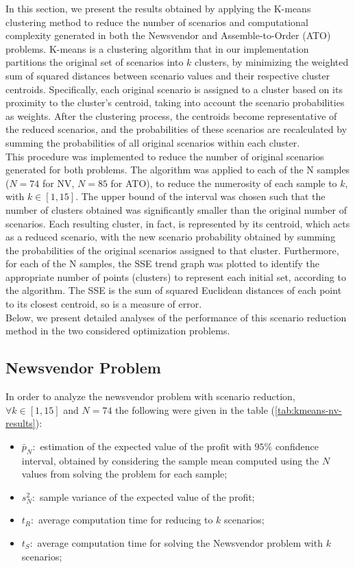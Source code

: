 \documentclass[a4paper,12pt]{article}
\begin{document}
	In this section, we present the results obtained by applying the K-means clustering method to reduce the number of scenarios and computational complexity generated in both the Newsvendor and Assemble-to-Order (ATO) problems. K-means is a clustering algorithm that in our implementation partitions the original set of scenarios into \(k\) clusters, by minimizing the weighted sum of squared distances between scenario values and their respective cluster centroids. Specifically, each original scenario is assigned to a cluster based on its proximity to the cluster's centroid, taking into account the scenario probabilities as weights. 
	After the clustering process, the centroids become representative of the reduced scenarios, and the probabilities of these scenarios are recalculated by summing the probabilities of all original scenarios within each cluster.\\
	
	\noindent This procedure was implemented to reduce the number of original scenarios generated for both problems. The algorithm was applied to each of the N samples ($N = 74$ for NV, $N = 85$ for ATO), to reduce the numerosity of each sample to $k$, with $k \in [1,15]$. The upper bound of the interval was chosen such that the number of clusters obtained was significantly smaller than the original number of scenarios. Each resulting cluster, in fact, is represented by its centroid, which acts as a reduced scenario, with the new scenario probability obtained by summing the probabilities of the original scenarios assigned to that cluster. Furthermore, for each of the N samples, the SSE trend graph was plotted to identify the appropriate number of points (clusters) to represent each initial set, according to the algorithm. The SSE is the sum of squared Euclidean distances of each point to its closest centroid, so is a measure of error.\\
	
	\noindent Below, we present detailed analyses of the performance of this scenario reduction method in the two considered optimization problems.
	
	\subsection{Newsvendor Problem}
	
	In order to analyze the newsvendor problem with scenario reduction, $\forall k \in [1,15]$ and $N = 74$ the following were given in the table (\ref{tab:kmeans-nv-results}):
	\begin{itemize}
		\item $\bar{p}_{N}:$ estimation of the expected value of the profit with $95\%$ confidence interval, obtained by considering the sample mean computed using the $N$ values from solving the problem for each sample; 
		\item $s^{2}_{N}:$ sample variance of the expected value of the profit;
		\item $t_{R}:$ average computation time for reducing to $k$ scenarios;
		\item $t_{S}:$ average computation time for solving the Newsvendor problem with $k$ scenarios;
	\end{itemize}~
	
\end{document}
